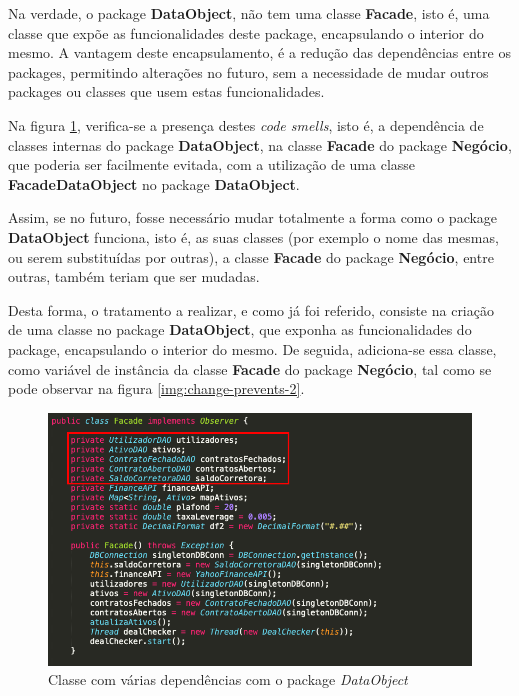 \hspace{5mm} Na verdade, o package \textbf{DataObject}, não tem uma classe \textbf{Facade}, isto é, uma classe que expõe as funcionalidades deste package, encapsulando o interior do mesmo. A vantagem deste encapsulamento, é a redução das dependências entre os packages, permitindo alterações no futuro, sem a necessidade de mudar outros packages ou classes que usem estas funcionalidades.

\hspace{5mm} Na figura \ref{img:change-prevents-1}, verifica-se a presença destes \textit{code smells}, isto é, a dependência de classes internas do package \textbf{DataObject}, na classe \textbf{Facade} do package \textbf{Negócio}, que poderia ser facilmente evitada, com a utilização de uma classe \textbf{FacadeDataObject} no package \textbf{DataObject}. 

\hspace{5mm} Assim, se no futuro, fosse necessário mudar totalmente a forma como o package \textbf{DataObject} funciona, isto é, as suas classes (por exemplo o nome das mesmas, ou serem substituídas por outras), a classe \textbf{Facade} do package \textbf{Negócio}, entre outras, também teriam que ser mudadas.

\hspace{5mm} Desta forma, o tratamento a realizar, e como já foi referido, consiste na criação de uma classe no package \textbf{DataObject}, que exponha as funcionalidades do package, encapsulando o interior do mesmo. De seguida,  adiciona-se essa classe, como variável de instância da classe \textbf{Facade} do package \textbf{Negócio}, tal como se pode observar na figura \ref{img:change-prevents-2}.

\begin{figure}[H]
	\centering
	\includegraphics[scale=0.50]{images/change-prevents/change-prevents-1.png}
	\caption{Classe com várias dependências com o package \emph{DataObject}}
	\label{img:change-prevents-1}
\end{figure}

